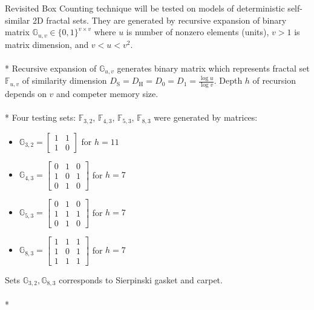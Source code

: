 \documentclass[a4paper,10pt]{article}
\begin{document}
Revisited Box Counting technique will be tested on models of deterministic self-similar 2D fractal sets. They are generated by recursive expansion of binary matrix $\mathbb{G}_{u,v} \in \{ 0, 1 \}^{v \times v} $ where $u$ is number of nonzero elements (units), $v>1$ is matrix dimension, and $v<u<v^2$. \\
\\*
Recursive expansion of $\mathbb{G}_{u,v}$ generates binary matrix which represents fractal set $\mathbb{F}_{u,v}$ of similarity dimension $D_{\text{S}} = D_{\text{H}} = D_{0} = D_{1} = \frac{\log{u}}{\log{v}}$. Depth $h$ of recursion depends on $v$ and competer memory size.\\
\\*
Four testing sets: $\mathbb{F}_{3,2}$, $\mathbb{F}_{4,3}$, $\mathbb{F}_{5,3}$, $\mathbb{F}_{8,3}$ were generated by matrices:
\begin{itemize}
\item 

$\mathbb{G}_{3,2} = \begin{bmatrix}
1 & 1 \\
1 & 0 
\end{bmatrix}$ for $h=11$ 

\item 

$\mathbb{G}_{4,3} = \begin{bmatrix}
0 & 1 & 0 \\
1 & 0 & 1 \\
0 & 1 & 0
\end{bmatrix}$ for $h=7$

\item 

$\mathbb{G}_{5,3} = \begin{bmatrix}
0 & 1 & 0 \\
1 & 1 & 1 \\
0 & 1 & 0
\end{bmatrix}$ for $h=7$

\item 

$\mathbb{G}_{8,3} = \begin{bmatrix}
1 & 1 & 1 \\
1 & 0 & 1 \\
1 & 1 & 1
\end{bmatrix}$ for $h=7$
\end{itemize}
Sets $\mathbb{G}_{3,2}, \mathbb{G}_{8,3}$ corresponds to Sierpinski gasket and carpet. \\
\\*
\end{document}
